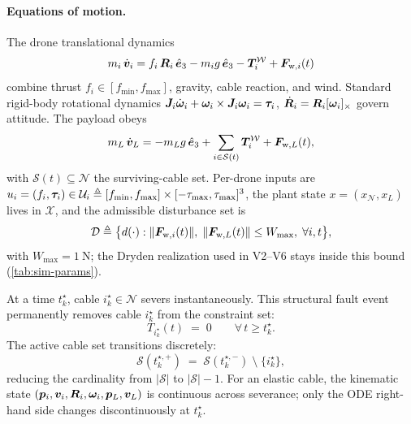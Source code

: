 \paragraph{Equations of motion.} The drone translational dynamics
\begin{equation}
 m_i\,\dot{\boldsymbol{v}}_i
    = f_i\,\boldsymbol{R}_i\,\hat{\boldsymbol{e}}_3
    - m_i g\,\hat{\boldsymbol{e}}_3
    - \boldsymbol{T}_i^{\mathcal{W}}
    + \boldsymbol{F}_{\mathrm{w},i}(t)
  \label{eq:drone-eom}
\end{equation}
combine thrust $f_i\in[f_{\min},f_{\max}]$, gravity, cable reaction, and wind. Standard rigid-body rotational dynamics $\boldsymbol{J}_i\dot{\boldsymbol{\omega}}_i+\boldsymbol{\omega}_i\times\boldsymbol{J}_i\boldsymbol{\omega}_i=\boldsymbol{\tau}_i$, $\dot{\boldsymbol{R}}_i=\boldsymbol{R}_i[\boldsymbol{\omega}_i]_\times$ govern attitude. The payload obeys
\begin{equation}
 m_L\,\dot{\boldsymbol{v}}_L
    = -m_L g\,\hat{\boldsymbol{e}}_3
    + \sum_{i\in\mathcal{S}(t)} \boldsymbol{T}_i^{\mathcal{W}}
    + \boldsymbol{F}_{\mathrm{w},L}(t),
  \label{eq:payload-eom}
\end{equation}
with $\mathcal{S}(t)\subseteq\mathcal{N}$ the surviving-cable set. Per-drone inputs are $u_i=(f_i,\boldsymbol{\tau}_i)\in\mathcal{U}_i\triangleq[f_{\min},f_{\max}]\times[-\tau_{\max},\tau_{\max}]^3$, the plant state $x=(x_{\mathcal{N}},x_L)$ lives in $\mathcal{X}$, and the admissible disturbance set is
\begin{equation}
\label{eq:disturbance-set}
  \mathcal{D} \triangleq \bigl\{ d(\cdot) :
    \|\boldsymbol{F}_{\mathrm{w},i}(t)\|,\; \|\boldsymbol{F}_{\mathrm{w},L}(t)\|
      \le W_{\max},\;\forall i,t \bigr\},
\end{equation}
with $W_{\max}=\SI{1}{\newton}$; the Dryden realization used in V2--V6 stays inside this bound (\cref{tab:sim-params}).



At a time $t_k^\star$, cable $i_k^\star \in \mathcal{N}$ severs instantaneously. This structural fault event permanently removes cable $i_k^\star$ from the constraint set:
\begin{equation}
 T_{i_k^\star}(t) \;=\; 0
  \qquad \forall\, t \ge t_k^\star.
  \label{eq:fault-tension-zero}
\end{equation}
The active cable set transitions discretely:
\begin{equation}
  \mathcal{S}(t_k^{\star,+}) \;=\; \mathcal{S}(t_k^{\star,-})
    \;\setminus\; \{i_k^\star\},
  \label{eq:S-transition}
\end{equation}
reducing the cardinality from $|\mathcal{S}|$ to $|\mathcal{S}| - 1$. For an elastic cable, the kinematic state $(\boldsymbol{p}_i, \boldsymbol{v}_i, \boldsymbol{R}_i, \boldsymbol{\omega}_i, \boldsymbol{p}_L, \boldsymbol{v}_L)$ is continuous across severance; only the ODE right-hand side changes discontinuously at $t_k^\star$.

